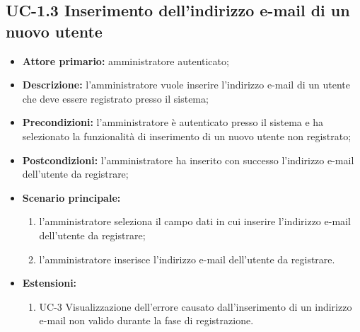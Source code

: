 \subsection{UC-1.3 Inserimento dell'indirizzo e-mail di un nuovo utente}
\begin{itemize}
	\item \textbf{Attore primario:} amministratore autenticato;

	\item \textbf{Descrizione:} l'amministratore vuole inserire l'indirizzo e-mail di un utente che deve essere registrato presso il sistema;

	\item \textbf{Precondizioni:} l'amministratore è autenticato presso il sistema e ha selezionato la funzionalità di inserimento di un nuovo utente non registrato;

	\item \textbf{Postcondizioni:} l'amministratore ha inserito con successo l'indirizzo e-mail dell'utente da registrare;

	\item \textbf{Scenario principale:}
	      \begin{enumerate}
		      \item l'amministratore seleziona il campo dati in cui inserire l'indirizzo e-mail dell'utente da registrare;
		      \item l'amministratore inserisce l'indirizzo e-mail dell'utente da registrare.
	      \end{enumerate}

	\item \textbf{Estensioni:}
	      \begin{enumerate}
		      \item UC-3 Visualizzazione dell'errore causato dall'inserimento di un indirizzo e-mail non valido durante la fase di registrazione.
	      \end{enumerate}
\end{itemize}
